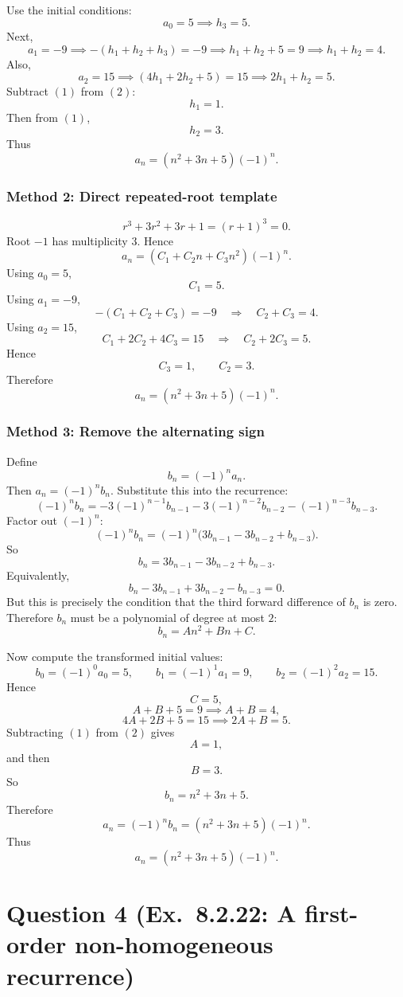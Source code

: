 \documentclass[12pt]{article}
\begin{document}
Use the initial conditions:
\[
a_0=5 \implies h_3=5.
\]
Next,
\[
a_1=-9 \implies -(h_1+h_2+h_3)=-9
\implies h_1+h_2+5=9
\implies h_1+h_2=4. \tag{1}
\]
Also,
\[
a_2=15 \implies (4h_1+2h_2+5)=15
\implies 2h_1+h_2=5. \tag{2}
\]
Subtract \((1)\) from \((2)\):
\[
h_1=1.
\]
Then from \((1)\),
\[
h_2=3.
\]
Thus
\[
\boxed{a_n=(n^2+3n+5)(-1)^n.}
\]

\newpage
\subsubsection{Method 2: Direct repeated-root template}
\[
r^3+3r^2+3r+1=(r+1)^3=0.
\]
Root \(-1\) has multiplicity \(3\). Hence
\[
a_n=(C_1+C_2 n+C_3 n^2)(-1)^n.
\]
Using \(a_0=5\),
\[
C_1=5.
\]
Using \(a_1=-9\),
\[
-(C_1+C_2+C_3)=-9
\quad\Longrightarrow\quad
C_2+C_3=4.
\]
Using \(a_2=15\),
\[
C_1+2C_2+4C_3=15
\quad\Longrightarrow\quad
C_2+2C_3=5.
\]
Hence
\[
C_3=1,\qquad C_2=3.
\]
Therefore
\[
\boxed{a_n=(n^2+3n+5)(-1)^n.}
\]

\newpage
\subsubsection{Method 3: Remove the alternating sign}
Define
\[
b_n=(-1)^n a_n.
\]
Then \(a_n=(-1)^n b_n\). Substitute this into the recurrence:
\[
(-1)^n b_n=-3(-1)^{n-1}b_{n-1}-3(-1)^{n-2}b_{n-2}-(-1)^{n-3}b_{n-3}.
\]
Factor out \((-1)^n\):
\[
(-1)^n b_n=(-1)^n\bigl(3b_{n-1}-3b_{n-2}+b_{n-3}\bigr).
\]
So
\[
b_n=3b_{n-1}-3b_{n-2}+b_{n-3}.
\]
Equivalently,
\[
b_n-3b_{n-1}+3b_{n-2}-b_{n-3}=0.
\]
But this is precisely the condition that the third forward difference of \(b_n\) is zero. Therefore \(b_n\) must be a polynomial of degree at most \(2\):
\[
b_n=An^2+Bn+C.
\]

Now compute the transformed initial values:
\[
b_0=(-1)^0 a_0=5,\qquad b_1=(-1)^1 a_1=9,\qquad b_2=(-1)^2 a_2=15.
\]
Hence
\[
C=5,
\]
\[
A+B+5=9 \implies A+B=4, \tag{1}
\]
\[
4A+2B+5=15 \implies 2A+B=5. \tag{2}
\]
Subtracting \((1)\) from \((2)\) gives
\[
A=1,
\]
and then
\[
B=3.
\]
So
\[
b_n=n^2+3n+5.
\]
Therefore
\[
a_n=(-1)^n b_n=(n^2+3n+5)(-1)^n.
\]
Thus
\[
\boxed{a_n=(n^2+3n+5)(-1)^n.}
\]

\newpage

\section{Question 4 (Ex.\ 8.2.22: A first-order non-homogeneous recurrence)}
\end{document}
